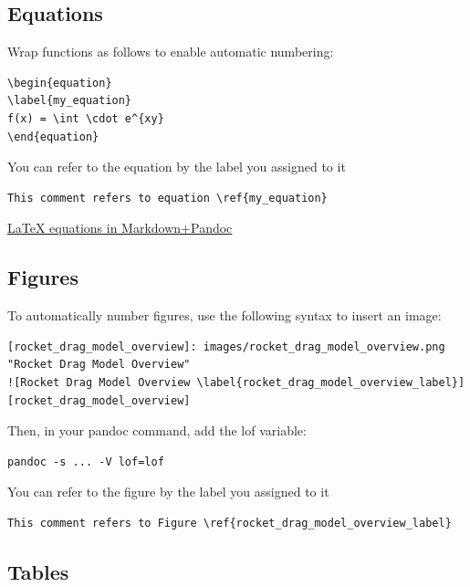 \documentclass[]{article}
\begin{document}
\subsection{Equations}\label{equations}

Wrap functions as follows to enable automatic numbering:

\begin{verbatim}
\begin{equation}
\label{my_equation}
f(x) = \int \cdot e^{xy}
\end{equation}
\end{verbatim}

You can refer to the equation by the label you assigned to it

\begin{verbatim}
This comment refers to equation \ref{my_equation}
\end{verbatim}

\href{http://stackoverflow.com/questions/25042901/how-to-use-latex-equation-environment-in-pandoc-markdown}{LaTeX
equations in Markdown+Pandoc}

\subsection{Figures}\label{figures}

To automatically number figures, use the following syntax to insert an
image:

\begin{verbatim}
[rocket_drag_model_overview]: images/rocket_drag_model_overview.png "Rocket Drag Model Overview" 
![Rocket Drag Model Overview \label{rocket_drag_model_overview_label}][rocket_drag_model_overview] 
\end{verbatim}

Then, in your pandoc command, add the lof variable:

\begin{verbatim}
pandoc -s ... -V lof=lof
\end{verbatim}

You can refer to the figure by the label you assigned to it

\begin{verbatim}
This comment refers to Figure \ref{rocket_drag_model_overview_label}
\end{verbatim}

\subsection{Tables}\label{tables}
\end{document}
